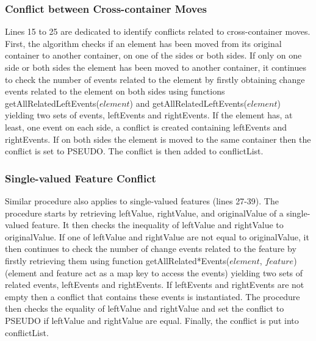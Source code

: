 \subsubsection{Conflict between Cross-container Moves} 
\label{sec:move_conflict} 
Lines 15 to 25 are dedicated to identify conflicts related to cross-container moves. 
First, the algorithm checks if an element has been moved from its original container to another container, on one of the sides or both sides. 
If only on one side or both sides the element has been moved to another container, 
it continues to check the number of events related to the element by firstly obtaining change events related to the element on 
both sides using functions \textsf{getAllRelatedLeftEvents($element$)} and \textsf{getAllRelatedLeftEvents($element$)} yielding two sets of events, 
\textsf{leftEvents} and \textsf{rightEvents}. If the element has, at least, one event on each side,
 a conflict is created containing \textsf{leftEvents} and \textsf{rightEvents}. 
 If on both sides the element is moved to the same container then the conflict is set to \textsf{PSEUDO}. The conflict is then added to \textsf{conflictList}. 

\subsubsection{Single-valued Feature Conflict} 
\label{sec:single_valued_conflict}
Similar procedure also applies to single-valued features (lines 27-39). The procedure starts by retrieving \textsf{leftValue}, \textsf{rightValue}, and \textsf{originalValue} of a single-valued feature. It then checks the inequality of \textsf{leftValue} and \textsf{rightValue} to \textsf{originalValue}. If one of \textsf{leftValue} and \textsf{rightValue} are not equal to \textsf{originalValue}, it then continues to check the number of change events related to the feature by firstly retrieving them using function \textsf{getAllRelated*Events($element$, $feature$)} (element and feature act as a map key to access the events) yielding two sets of related events, \textsf{leftEvents} and \textsf{rightEvents}. If \textsf{leftEvents} and \textsf{rightEvents} are not empty then a conflict that contains these events is instantiated. The procedure then checks the equality of \textsf{leftValue} and \textsf{rightValue} and set the conflict to \textsf{PSEUDO} if \textsf{leftValue} and \textsf{rightValue} are equal. Finally, the conflict is put into \textsf{conflictList}. 

